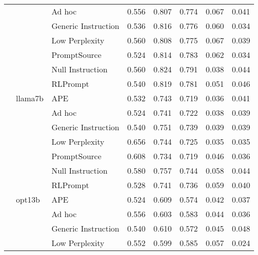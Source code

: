 \begin{supertabular}{lllrrrrr}
              &        & Ad hoc &            0.556 &           0.807 &          0.774 &        0.067 &    0.041 \\
              &        & Generic Instruction &            0.536 &           0.816 &          0.776 &        0.060 &    0.034 \\
              &        & Low Perplexity &            0.560 &           0.808 &          0.775 &        0.067 &    0.039 \\
              &        & PromptSource &            0.524 &           0.814 &          0.783 &        0.062 &    0.034 \\
              &        & Null Instruction &            0.560 &           0.824 &          0.791 &        0.038 &    0.044 \\
              &        & RLPrompt &            0.540 &           0.819 &          0.781 &        0.051 &    0.046 \\
              & llama7b & APE &            0.532 &           0.743 &          0.719 &        0.036 &    0.041 \\
              &        & Ad hoc &            0.524 &           0.741 &          0.722 &        0.038 &    0.039 \\
              &        & Generic Instruction &            0.540 &           0.751 &          0.739 &        0.039 &    0.039 \\
              &        & Low Perplexity &            0.656 &           0.744 &          0.725 &        0.035 &    0.035 \\
              &        & PromptSource &            0.608 &           0.734 &          0.719 &        0.046 &    0.036 \\
              &        & Null Instruction &            0.580 &           0.757 &          0.744 &        0.058 &    0.044 \\
              &        & RLPrompt &            0.528 &           0.741 &          0.736 &        0.059 &    0.040 \\
              & opt13b & APE &            0.524 &           0.609 &          0.574 &        0.042 &    0.037 \\
              &        & Ad hoc &            0.556 &           0.603 &          0.583 &        0.044 &    0.036 \\
              &        & Generic Instruction &            0.540 &           0.610 &          0.572 &        0.045 &    0.048 \\
              &        & Low Perplexity &            0.552 &           0.599 &          0.585 &        0.057 &    0.024 \\

\end{supertabular}
